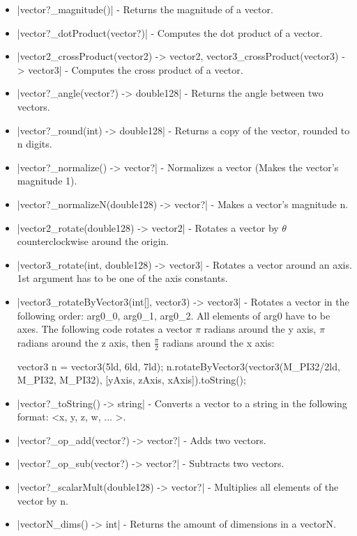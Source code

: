 \documentclass[12pt, letterpaper, oneside]{article}
\begin{document}
	\begin{itemize}
		\item[--] \spverb|vector?_magnitude()| - Returns the magnitude of a vector.
		\item[--] \spverb|vector?_dotProduct(vector?)| - Computes the dot product of a vector.
		\item[--] \spverb|vector2_crossProduct(vector2) -> vector2, vector3_crossProduct(vector3) -> vector3| - Computes the cross product of a vector.
		\item[--] \spverb|vector?_angle(vector?) -> double128| - Returns the angle between two vectors.
		\item[--] \spverb|vector?_round(int) -> double128| - Returns a copy of the vector, rounded to n digits.
		\item[--] \spverb|vector?_normalize() -> vector?| - Normalizes a vector (Makes the vector's magnitude 1).
		\item[--] \spverb|vector?_normalizeN(double128) -> vector?| - Makes a vector's magnitude n.
		\item[--] \spverb|vector2_rotate(double128) -> vector2| - Rotates a vector by $\theta$ counterclockwise around the origin.
		\item[--] \spverb|vector3_rotate(int, double128) -> vector3| - Rotates a vector around an axis. 1st argument has to be one of the axis constants.
		\item[--] \spverb|vector3_rotateByVector3(int[], vector3) -> vector3| - Rotates a vector in the following order: arg0\_0, arg0\_1, arg0\_2. All elements of arg0 have to be axes. The following code rotates a vector $\pi$ radians around the y axis, $\pi$ radians around the z axis, then $\frac{\pi}{2}$ radians around the x axis:
		
		
		\begin{spverbatim}
			vector3 n = vector3(5ld, 6ld, 7ld);
			n.rotateByVector3(vector3(M_PI32/2ld, M_PI32, M_PI32), [yAxis, zAxis, xAxis]).toString();
		\end{spverbatim}
		\item[--] \spverb|vector?_toString() -> string| - Converts a vector to a string in the following format: <x, y, z, w, ... >.
		\item[--] \spverb|vector?_op_add(vector?) -> vector?| - Adds two vectors.
		\item[--] \spverb|vector?_op_sub(vector?) -> vector?| - Subtracts two vectors.
		\item[--] \spverb|vector?_scalarMult(double128) -> vector?| - Multiplies all elements of the vector by n.
		\item[--] \spverb|vectorN_dims() -> int| - Returns the amount of dimensions in a vectorN.
	\end{itemize}
	\newpage
\end{document}
